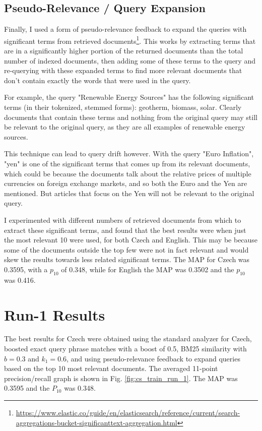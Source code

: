 \documentclass[a4paper]{article}
\begin{document}
\subsection{Pseudo-Relevance / Query Expansion}
Finally, I used a form of pseudo-relevance feedback to expand the queries with
significant terms from retrieved documents\footnote{\url{https://www.elastic.co/guide/en/elasticsearch/reference/current/search-aggregations-bucket-significanttext-aggregation.html}}.
This works by extracting terms that are in a significantly higher portion of the
returned documents than the total number of indexed documents, then adding some
of these terms to the query and re-querying with these expanded terms to find
more relevant documents that don't contain exactly the words that were used in
the query.

For example, the query "Renewable Energy Sources" has the following significant
terms (in their tokenized, stemmed forms): geotherm, biomass, solar. Clearly
documents that contain these terms and nothing from the original query may still
be relevant to the original query, as they are all examples of renewable energy
sources. 

This technique can lead to query drift however. With the query "Euro Inflation",
"yen" is one of the significant terms that comes up from its relevant documents,
which could be because the documents talk about the relative prices of multiple
currencies on foreign exchange markets, and so both the Euro and the Yen are
mentioned. But articles that focus on the Yen will not be relevant to the
original query.

I experimented with different numbers of retrieved documents from which to
extract these significant terms, and found that the best results were when just
the most relevant 10 were used, for both Czech and English. This may be because
some of the documents outside the top few were not in fact relevant and would
skew the results towards less related significant terms. The MAP for Czech was
0.3595, with a $p_{10}$ of 0.348, while for English the MAP was 0.3502 and the
$p_{10}$ was 0.416.

\section{Run-1 Results}

The best results for Czech were obtained using the standard analyzer for Czech,
boosted exact query phrase matches with a boost of 0.5, BM25 similarity with
$b=0.3$ and $k_1=0.6$, and using pseudo-relevance feedback to expand queries
based on the top 10 most relevant documents. The averaged 11-point
precision/recall graph is shown in Fig. \ref{fig:cs_train_run_1}. The MAP was
0.3595 and the $P_{10}$ was 0.348.
\end{document}
